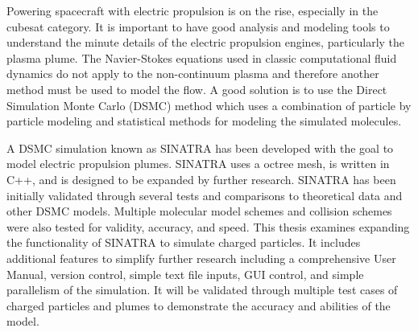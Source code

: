 Powering spacecraft with electric propulsion is on the rise, especially in the cubesat category. It is important to have good analysis and modeling tools to understand the minute details of the electric propulsion engines, particularly the plasma plume. The Navier-Stokes equations used in classic computational fluid dynamics do not apply to the non-continuum plasma and therefore another method must be used to model the flow. A good solution is to use the Direct Simulation Monte Carlo (DSMC) method which uses a combination of particle by particle modeling and statistical methods for modeling the simulated molecules. 

A DSMC simulation known as SINATRA has been developed with the goal to model electric propulsion plumes. SINATRA uses a octree mesh, is written in C++, and is designed to be expanded by further research. SINATRA has been initially validated through several tests and comparisons to theoretical data and other DSMC models. Multiple molecular model schemes and collision schemes were also tested for validity, accuracy, and speed. This thesis examines expanding the functionality of SINATRA to simulate charged particles. It includes additional features to simplify further research including  a comprehensive User Manual, version control, simple text file inputs, GUI control, and simple parallelism of the simulation. It will be validated through multiple test cases of charged particles and plumes to demonstrate the accuracy and abilities of the model.
